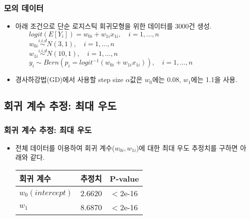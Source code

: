 \documentclass{beamer}
\begin{document}
\begin{frame}
\frametitle{모의 데이터}
\begin{itemize}
\item 아래 조건으로 단순 로지스틱 회귀모형을 위한 데이터를 3000건 생성.\\
$\qquad logit(E[Y_i]) = w_{0i} + w_{1i} x_{1i}, \quad i=1, ..., n$  \\
$\qquad w_{0i} \overset{i.i.d}{\sim} N(3,1), \quad i=1, ..., n$ \\
$\qquad w_{1i} \overset{i.i.d}{\sim} N(10,1), \quad i=1, ..., n$ \\
$\qquad y_i \sim Bern(p_i =logit^{-1}(w_{0i} + w_{1i} x_{1i})), \quad i=1, ..., n$

\item 경사하강법(GD)에서 사용할 step size $\alpha$값은 $w_0$에는 0.08, $w_1$에는 1.1을 사용.

\end{itemize}
\end{frame}







\subsection{회귀 계수 추정: 최대 우도} %


\begin{frame}
\frametitle{회귀 계수 추정: 최대 우도}
\begin{itemize}
\item 전체 데이터를 이용하여 회귀 계수($w_{0i}, w_{1i}$)에 대한 최대 우도 추정치를 구하면 아래와 같다.\\


\begin{center}
\begin{tabular}{l l l}
\toprule
\textbf{회귀 계수} & \textbf{추정치} & \textbf{P-value}\\
\midrule
$w_0(intercept)$ 	& 2.6620 & $<$2e-16 \\
$w_1$ 						& 8.6870 & $<$2e-16 \\
\bottomrule
\end{tabular}
\end{center}

\end{itemize}
\end{frame}
\end{document}
